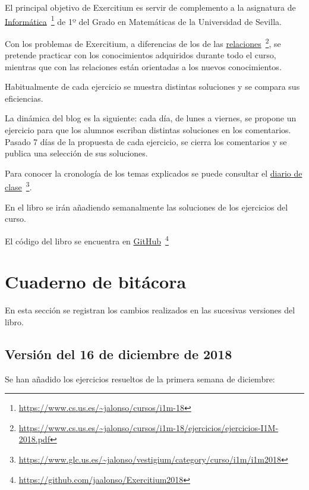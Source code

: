 \documentclass[a4paper,12pt,twoside]{book}
\begin{document}
El principal objetivo de Exercitium es servir de complemento a la
asignatura de
\href{https://www.cs.us.es/~jalonso/cursos/i1m-18}
     {Informática}\
     \footnote{\url{https://www.cs.us.es/~jalonso/cursos/i1m-18}}
de 1º del Grado en Matemáticas de la Universidad de Sevilla.

Con los problemas de Exercitium, a diferencias de los de las
\href{https://www.cs.us.es/~jalonso/cursos/i1m-18/ejercicios/ejercicios-I1M-2018.pdf}
     {relaciones}\
     \footnote{\url{https://www.cs.us.es/~jalonso/cursos/i1m-18/ejercicios/ejercicios-I1M-2018.pdf}},
se pretende practicar con los conocimientos adquiridos durante todo el
curso, mientras que con las relaciones están orientadas a los nuevos
conocimientos.

Habitualmente de cada ejercicio se muestra distintas soluciones y se
compara sus eficiencias.

La dinámica del blog es la siguiente: cada día, de lunes a viernes, se
propone un ejercicio para que los alumnos escriban distintas soluciones
en los comentarios. Pasado 7 días de la propuesta de cada ejercicio, se
cierra los comentarios y se publica una selección de sus soluciones.

Para conocer la cronología de los temas explicados se puede consultar el
\href{https://www.glc.us.es/~jalonso/vestigium/category/curso/i1m/i1m2018}
     {diario de clase}\
     \footnote{\url{https://www.glc.us.es/~jalonso/vestigium/category/curso/i1m/i1m2018}}.

En el libro se irán añadiendo semanalmente las soluciones de los
ejercicios del curso.

El código del libro se encuentra en
\href{https://github.com/jaalonso/Exercitium2018}
     {GitHub}\
     \footnote{\url{https://github.com/jaalonso/Exercitium2018}}

\section*{Cuaderno de bitácora}

En esta sección se registran los cambios realizados en las sucesivas
versiones del libro.

\subsection*{Versión del 16 de diciembre de 2018}

Se han añadido los ejercicios resueltos de la primera semana de
diciembre:
\end{document}
